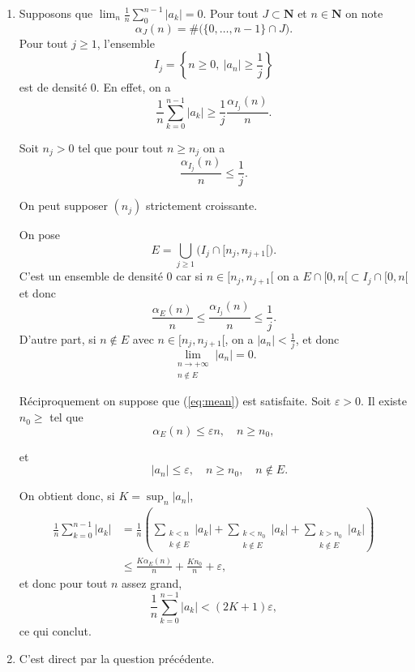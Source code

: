 \documentclass[a4paper,12pt,openany]{article}
\theoremstyle{plain}
\theoremstyle{definition}
\newcommand{\N}{\mathbf{N}}
\begin{document}
\begin{enumerate}
\item Supposons que $\lim_n \frac{1}{n}\sum_{0}^{n-1} |a_k| = 0.$ Pour tout $J \subset \N$ et $n \in \N$ on note
$$
\alpha_J(n) = \# \bigl(\{0, \dots, n-1\} \cap J \bigr).
$$
 Pour tout $j \geqslant 1$, l'ensemble
$$
I_j = \left\{n \geqslant 0,~|a_n| \geqslant \frac{1}{j}\right\}
$$
est de densit\'e $0$.  En effet, on a
$$
\frac{1}{n}\sum_{k=0}^{n-1} |a_k| \geqslant  \frac{1}{j} \frac{\alpha_{I_j}(n)}{n}.
$$

Soit $n_j > 0$ tel que pour tout $n \geqslant n_j$ on a 
$$
\frac{\alpha_{I_j}(n)}{n} \leqslant \frac{1}{j}.
$$

On peut supposer $(n_j)$ strictement croissante.



On pose
$$
E = \bigcup_{j \geqslant 1} \bigl(I_{j} \cap [n_j, n_{j+1}[\bigr).
$$
 C'est un ensemble de densit\'e $0$ car si $n \in [n_j, n_{j+1}[$ on a $E \cap [0, n[ \subset I_{j} \cap [0,n[$ et donc 
$$
\frac{\alpha_{E}(n)}{n} \leqslant \frac{\alpha_{I_j}(n)}{n} \leqslant \frac{1}{j}.
$$
 D'autre part, si $n \notin E$ avec $n \in [n_j, n_{j+1}[$, on a 
$\displaystyle{|a_n|< \frac{1}{j}}$,  et donc 
\begin{equation}\label{eq:mean}
\lim_{\substack{n \to +\infty \\n \notin E}} |a_n| = 0.
\end{equation}

R\'eciproquement on suppose que (\ref{eq:mean}) est satisfaite.  Soit $\varepsilon > 0$. Il existe $n_0 \geqslant$ tel que 
$$\alpha_E(n) \leqslant \varepsilon n, \quad  n \geqslant n_0,$$

et 
$$
\quad |a_n| \leqslant \varepsilon, \quad n \geqslant n_0, \quad n \notin E.
$$



On obtient donc, si $K = \sup_n |a_n|$,
$$
\begin{aligned}
\frac{1}{n} \sum_{k=0}^{n-1} |a_k| &= \frac{1}{n} \left( \sum_{\substack{k < n \\ k \notin E}} |a_k| + \sum_{\substack{k < n_0 \\ k \notin E}} |a_k| + \sum_{\substack{k > n_0 \\ k \notin E}} |a_k| \right)  \\
&\leqslant \frac{K \alpha_{E}(n)}{n} + \frac{Kn_0}{n} + \varepsilon,
\end{aligned}
$$
 et donc pour tout $n$ assez grand,
$$
\frac{1}{n} \sum_{k=0}^{n-1} |a_k| < (2K + 1) \varepsilon,
$$
ce qui conclut.
\item C'est direct par la question pr\'ec\'edente.

\end{enumerate}
\end{document}
